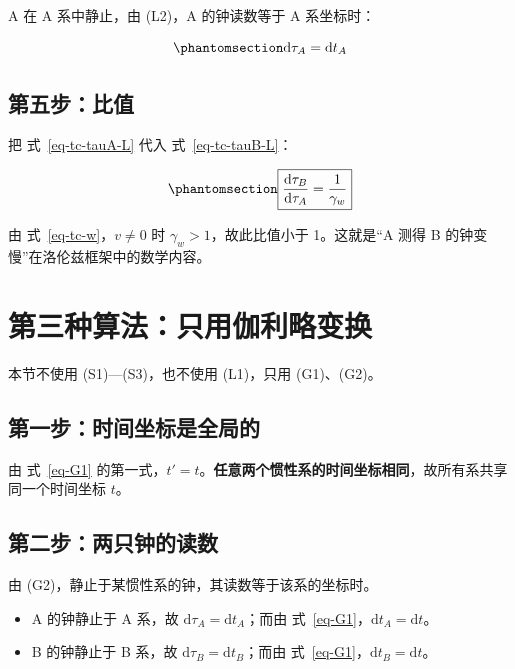 \documentclass[
  chinese,
  a4paper,
  UTF8,
  12pt,
  oneside,
  openany]{ctexbook}
\providecommand{\tightlist}{%
  \setlength{\itemsep}{0pt}\setlength{\parskip}{0pt}}
\theoremstyle{plain}
\theoremstyle{plain}
\theoremstyle{plain}
\theoremstyle{definition}
\theoremstyle{plain}
\theoremstyle{plain}
\theoremstyle{remark}
\begin{document}
A 在 A 系中静止，由 (L2)，A 的钟读数等于 A 系坐标时：

\begin{equation}\protect\phantomsection\label{eq-tc-tauA-L}{
\mathrm{d}\tau_A=\mathrm{d}t_A
}\end{equation}

\subsection{第五步：比值}\label{ux7b2cux4e94ux6b65ux6bd4ux503c}

把 式~\ref{eq-tc-tauA-L} 代入 式~\ref{eq-tc-tauB-L}：

\begin{equation}\protect\phantomsection\label{eq-tc-ratio-L}{
\boxed{\dfrac{\mathrm{d}\tau_B}{\mathrm{d}\tau_A}=\dfrac{1}{\gamma_w}}
}\end{equation}

由 式~\ref{eq-tc-w}，\(v\neq0\) 时 \(\gamma_w>1\)，故此比值小于
1。这就是``A 测得 B 的钟变慢''在洛伦兹框架中的数学内容。

\section{第三种算法：只用伽利略变换}\label{sec-tc-galilei}

本节不使用 (S1)---(S3)，也不使用 (L1)，只用 (G1)、(G2)。

\subsection{第一步：时间坐标是全局的}\label{ux7b2cux4e00ux6b65ux65f6ux95f4ux5750ux6807ux662fux5168ux5c40ux7684}

由 式~\ref{eq-G1}
的第一式，\(t'=t\)。\textbf{任意两个惯性系的时间坐标相同}，故所有系共享同一个时间坐标
\(t\)。

\subsection{第二步：两只钟的读数}\label{ux7b2cux4e8cux6b65ux4e24ux53eaux949fux7684ux8bfbux6570}

由 (G2)，静止于某惯性系的钟，其读数等于该系的坐标时。

\begin{itemize}
\tightlist
\item
  A 的钟静止于 A 系，故 \(\mathrm{d}\tau_A=\mathrm{d}t_A\)；而由
  式~\ref{eq-G1}，\(\mathrm{d}t_A=\mathrm{d}t\)。
\item
  B 的钟静止于 B 系，故 \(\mathrm{d}\tau_B=\mathrm{d}t_B\)；而由
  式~\ref{eq-G1}，\(\mathrm{d}t_B=\mathrm{d}t\)。
\end{itemize}
\end{document}
